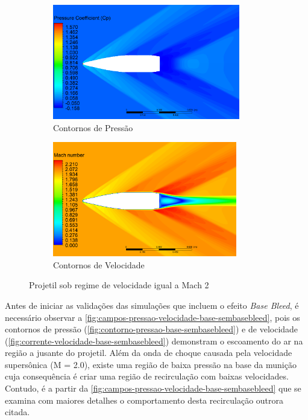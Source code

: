\begin{figure}[!ht]
	\centering
	\begin{subfigure}[b]{0.47\textwidth}
        \centering
        \includegraphics[height=5cm,width=\textwidth]{contorno-pressao.png}
        \caption{Contornos de Pressão}
        \label{fig:contorno-pressao-sembasebleed}
    \end{subfigure}
    \hfill
	\begin{subfigure}[b]{0.47\textwidth}
        \centering
        \includegraphics[height=5cm,width=\textwidth]{contorno-velocidade.png}
        \caption{Contornos de Velocidade}
        \label{fig:contorno-velocidade-sembasebleed}
    \end{subfigure}
	\caption{Projetil sob regime de velocidade igual a Mach \num{2}}
	\label{fig:contornos-pressao-velocidade-sembasebleed}
\end{figure}

Antes de iniciar as validações das simulações que incluem o efeito \textit{Base Bleed}, é necessário observar a \autoref{fig:campos-pressao-velocidade-base-sembasebleed}, pois os contornos de pressão (\autoref{fig:contorno-pressao-base-sembasebleed}) e de velocidade (\autoref{fig:corrente-velocidade-base-sembasebleed}) demonstram o escoamento do ar na região a jusante do projetil. Além da onda de choque causada pela velocidade supersônica (M = \num{2,0}), existe uma região de baixa pressão na base da munição cuja consequência é criar uma região de recirculação com baixas velocidades. Contudo, é a partir da \autoref{fig:campos-pressao-velocidade-base-sembasebleed} que se examina com maiores detalhes o comportamento desta recirculação outrora citada.

